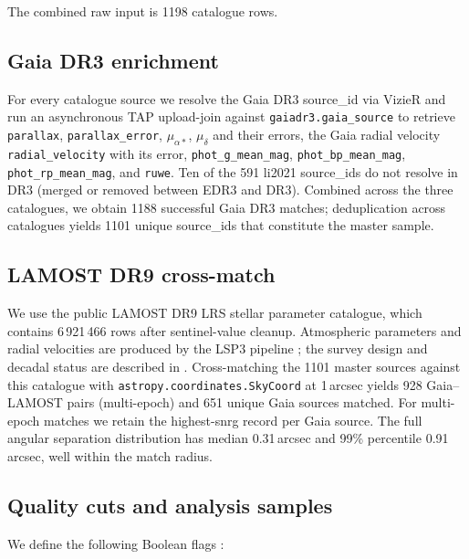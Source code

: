 \documentclass{caosp310}
\begin{document}
The combined raw input is 1198 catalogue rows.

\subsection{Gaia DR3 enrichment}
\label{sec:gaia}

For every catalogue source we resolve the Gaia DR3 source\_id via VizieR
and run an asynchronous TAP upload-join against \texttt{gaiadr3.gaia\_source}
\citep{GaiaDR3Summary2023} to retrieve \texttt{parallax},
\texttt{parallax\_error}, $\mu_{\alpha*}$, $\mu_\delta$ and their errors, the
Gaia radial velocity \texttt{radial\_velocity} with its error,
\texttt{phot\_g\_mean\_mag}, \texttt{phot\_bp\_mean\_mag}, \texttt{phot\_rp\_mean\_mag},
and \texttt{ruwe}. Ten of the 591 li2021 source\_ids do not resolve in DR3
(merged or removed between EDR3 and DR3). Combined across the three
catalogues, we obtain 1188 successful Gaia DR3 matches; deduplication
across catalogues yields 1101 unique source\_ids that constitute the
master sample.

\subsection{LAMOST DR9 cross-match}
\label{sec:lamost}

We use the public LAMOST DR9 LRS stellar parameter catalogue, which
contains 6\,921\,466 rows after sentinel-value cleanup. Atmospheric
parameters and radial velocities are produced by the LSP3 pipeline
\citep{Xiang2015LSP3}; the survey design and decadal status are described
in \citet{Zhao2012LAMOSTSurvey,Deng2012LEGUE,Yan2022LAMOSTDecade}.
Cross-matching the 1101 master sources against this catalogue with
\texttt{astropy.coordinates.SkyCoord} \citep{Astropy2013,Astropy2018} at
1\,arcsec yields 928 Gaia--LAMOST pairs (multi-epoch) and 651 unique Gaia
sources matched. For multi-epoch matches we retain the highest-snrg
record per Gaia source. The full angular separation distribution has
median 0.31\,arcsec and 99\% percentile 0.91\,arcsec, well within the
match radius.

\subsection{Quality cuts and analysis samples}
\label{sec:cuts}

We define the following Boolean flags
\citep[motivated by][]{Lindegren2021ParallaxBias,Luri2018GaiaParallaxes}:
\end{document}
